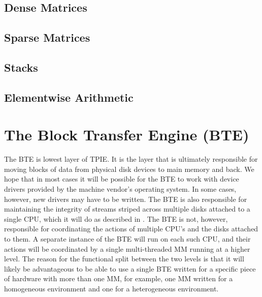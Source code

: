 
\subsection{Dense Matrices}
\label{sec:ref-imp-ami-matrix}


\subsection{Sparse Matrices}
\label{sec:ref-imp-ami-sm}


\subsection{Stacks}
\label{sec:ref-imp-ami-stack}


\subsection{Elementwise Arithmetic}
\label{sec:ref-imp-ami-arith}


\section{The Block Transfer Engine (BTE)}
\label{sec:ref-bte}

The BTE is lowest layer of TPIE.  It is the layer that is ultimately
responsible for moving blocks of data from physical disk devices to main
memory and back.  We hope that in most cases it will be possible for the
BTE to work with device drivers provided by the machine vendor's operating
system.  In some cases, however, new drivers may have to be written.  The
BTE is also responsible for maintaining the integrity of streams striped
across multiple disks attached to a single CPU, which it will do as
described in \cite{vitter:parmem1}.  The BTE is not, however, responsible
for coordinating the actions of multiple CPU's and the disks attached to
them.  A separate instance of the BTE will run on each such CPU, and their
actions will be coordinated by a single multi-threaded MM running at a
higher level.  The reason for the functional split between the two levels
is that it will likely be advantageous to be able to use a single BTE
written for a specific piece of hardware with more than one MM, for
example, one MM written for a homogeneous environment and one for a
heterogeneous environment.

